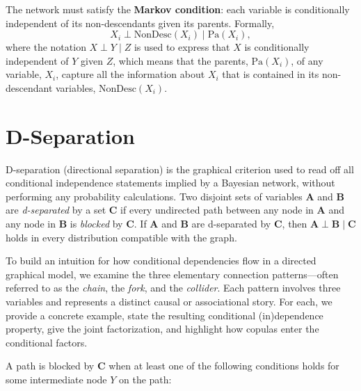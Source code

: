 The network must satisfy the \textbf{Markov condition}: each variable is
conditionally independent of its non-descendants given its parents. Formally,
\[
X_i \perp \mathrm{NonDesc}(X_i) \mid \mathrm{Pa}(X_i),
\]
where the notation $X \perp Y \mid Z$ is used to express that $X$ is conditionally independent of $Y$ given $Z$,
which means that the parents, $\mathrm{Pa}(X_i)$, of any variable, $X_i$, capture all the information about $X_i$ that is contained in its non-descendant variables, $\mathrm{NonDesc}(X_i)$.

\section{D-Separation}\label{sec:dsep}

D-separation (directional separation) is the graphical criterion used to read
off all conditional independence statements implied by a Bayesian network,
without performing any probability calculations. Two disjoint sets of variables
$\mathbf{A}$ and $\mathbf{B}$ are \emph{d-separated} by a set $\mathbf{C}$ if
every undirected path between any node in $\mathbf{A}$ and any node in
$\mathbf{B}$ is \emph{blocked} by $\mathbf{C}$. If $\mathbf{A}$ and
$\mathbf{B}$ are d-separated by $\mathbf{C}$, then
$\mathbf{A} \perp \mathbf{B} \mid \mathbf{C}$ holds in every distribution
compatible with the graph.

To build an intuition for how conditional dependencies flow in a directed graphical model, we examine the three elementary connection patterns---often referred to as the \emph{chain}, the \emph{fork}, and the \emph{collider}. Each pattern involves three variables and represents a distinct causal or associational story. For each, we provide a concrete example, state the resulting conditional (in)dependence property, give the joint factorization, and highlight how copulas enter the conditional factors.

A path is blocked by $\mathbf{C}$ when at least one of the following
conditions holds for some intermediate node $Y$ on the path:

